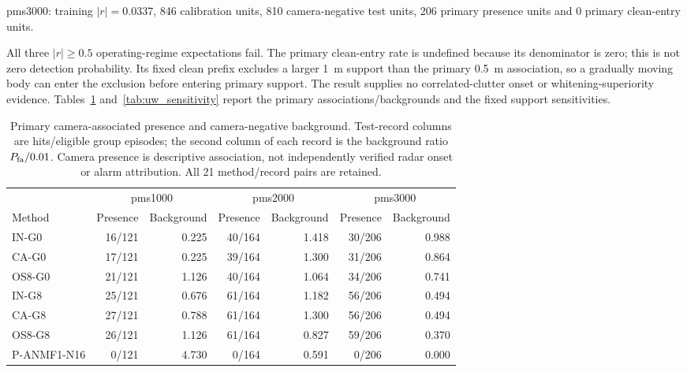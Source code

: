 \documentclass[10pt]{article}
\begin{document}
pms3000: training $|r|=0.0337$, 846 calibration units, 810 camera-negative test units, 206 primary presence units and 0 primary clean-entry units.

All three $|r|\ge0.5$ operating-regime expectations fail. The primary clean-entry rate is undefined because its denominator is zero; this is not zero detection probability. Its fixed clean prefix excludes a larger 1~m support than the primary 0.5~m association, so a gradually moving body can enter the exclusion before entering primary support. The result supplies no correlated-clutter onset or whitening-superiority evidence. Tables~\ref{tab:uw_primary} and~\ref{tab:uw_sensitivity} report the primary associations/backgrounds and the fixed support sensitivities.
\begin{table}[htbp]\centering\small
\caption{Primary camera-associated presence and camera-negative background. Test-record columns are hits/eligible group episodes; the second column of each record is the background ratio $P_{\rm fa}/0.01$. Camera presence is descriptive association, not independently verified radar onset or alarm attribution. All 21 method/record pairs are retained.}\label{tab:uw_primary}
\begin{tabular}{l*{6}{r}}\toprule
 & \multicolumn{2}{c}{pms1000} & \multicolumn{2}{c}{pms2000} & \multicolumn{2}{c}{pms3000}\\
Method & Presence & Background & Presence & Background & Presence & Background\\\midrule
IN-G0 & 16/121 & 0.225 & 40/164 & 1.418 & 30/206 & 0.988\\
CA-G0 & 17/121 & 0.225 & 39/164 & 1.300 & 31/206 & 0.864\\
OS8-G0 & 21/121 & 1.126 & 40/164 & 1.064 & 34/206 & 0.741\\
IN-G8 & 25/121 & 0.676 & 61/164 & 1.182 & 56/206 & 0.494\\
CA-G8 & 27/121 & 0.788 & 61/164 & 1.300 & 56/206 & 0.494\\
OS8-G8 & 26/121 & 1.126 & 61/164 & 0.827 & 59/206 & 0.370\\
P-ANMF1-N16 & 0/121 & 4.730 & 0/164 & 0.591 & 0/206 & 0.000\\
\bottomrule\end{tabular}\end{table}
\end{document}
